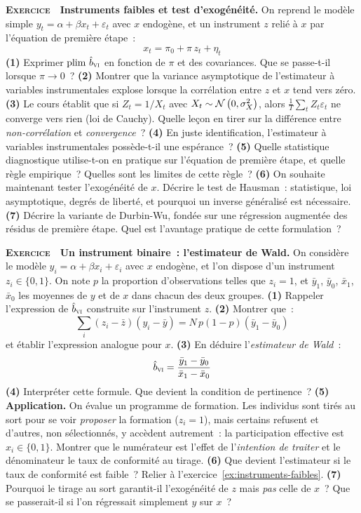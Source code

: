 \documentclass[10pt,a4paper,notitlepage]{article}
\newcounter{xnumber}
\newcommand{\exercice}{\refstepcounter{xnumber}\textsc{\textbf{Exercice}} \textbf{\thexnumber}\,\,}
\newcommand{\question}[1]{\textbf{(#1)}}
\begin{document}
\exercice\label{ex:instruments-faibles} \textbf{Instruments faibles et test d'exogénéité.} On reprend le
modèle simple $y_t = \alpha + \beta x_t + \varepsilon_t$ avec $x$ endogène, et
un instrument $z$ relié à $x$ par l'équation de première étape~:
\[
  x_t = \pi_0 + \pi\, z_t + \eta_t
\]
\question{1} Exprimer $\mathrm{plim}\ \hat b_{\textsc{vi}}$ en fonction de
$\pi$ et des covariances. Que se passe-t-il lorsque $\pi\to 0$~? \question{2}
Montrer que la variance asymptotique de l'estimateur à variables instrumentales
explose lorsque la corrélation entre $z$ et $x$ tend vers zéro. \question{3} Le
cours établit que si $Z_t = 1/X_t$ avec $X_t\sim\mathcal N\left(0,\sigma_X^2\right)$, alors
$\frac1T\sum_t Z_t\varepsilon_t$ ne converge vers rien (loi de Cauchy). Quelle
leçon en tirer sur la différence entre \emph{non-corrélation} et
\emph{convergence}~? \question{4} En juste identification, l'estimateur à
variables instrumentales possède-t-il une espérance~? \question{5} Quelle
statistique diagnostique utilise-t-on en pratique sur l'équation de première
étape, et quelle règle empirique~? Quelles sont les limites de cette règle~?
\question{6} On souhaite maintenant tester l'exogénéité de $x$. Décrire le test
de Hausman~: statistique, loi asymptotique, degrés de liberté, et pourquoi un
inverse généralisé est nécessaire. \question{7} Décrire la variante de
Durbin-Wu, fondée sur une régression augmentée des résidus de première étape.
Quel est l'avantage pratique de cette formulation~?\newline

\bigskip
\exercice\label{ex:wald} \textbf{Un instrument binaire~: l'estimateur de Wald.}
On considère le modèle $y_i = \alpha+\beta x_i+\varepsilon_i$ avec $x$ endogène,
et l'on dispose d'un instrument $z_i\in\{0,1\}$. On note $p$ la proportion
d'observations telles que $z_i=1$, et $\bar y_1$, $\bar y_0$, $\bar x_1$,
$\bar x_0$ les moyennes de $y$ et de $x$ dans chacun des deux groupes.
\question{1} Rappeler l'expression de $\hat b_{\textsc{vi}}$ construite sur
l'instrument $z$. \question{2} Montrer que~:
\[
  \sum_i \left(z_i-\bar z\right)\left(y_i-\bar y\right) = N\,p(1-p)\left(\bar y_1-\bar y_0\right)
\]
et établir l'expression analogue pour $x$. \question{3} En déduire
l'\emph{estimateur de Wald}~:
\[
  \hat b_{\textsc{vi}} = \frac{\bar y_1-\bar y_0}{\bar x_1-\bar x_0}
\]
\question{4} Interpréter cette formule. Que devient la condition de pertinence~?
\question{5} \textbf{Application.} On évalue un programme de formation. Les
individus sont tirés au sort pour se voir \emph{proposer} la formation
($z_i=1$), mais certains refusent et d'autres, non sélectionnés, y accèdent
autrement~: la participation effective est $x_i\in\{0,1\}$. Montrer que le
numérateur est l'effet de l'\emph{intention de traiter} et le dénominateur le
taux de conformité au tirage. \question{6} Que devient l'estimateur si le taux
de conformité est faible~? Relier à l'exercice~\ref{ex:instruments-faibles}.
\question{7} Pourquoi le tirage au sort garantit-il l'exogénéité de $z$ mais
\emph{pas} celle de $x$~? Que se passerait-il si l'on régressait simplement $y$
sur $x$~?\newline
\end{document}
